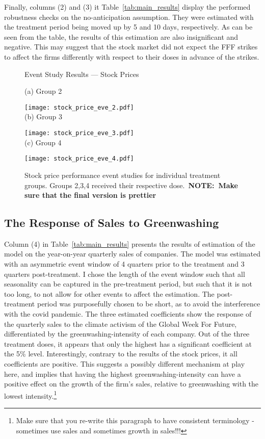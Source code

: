 \documentclass[12pt]{article}
\begin{document}
Finally, columns (2) and (3) it Table~\ref{tab:main_results} display the performed robustness checks on the no-anticipation assumption. They were estimated with the treatment period being moved up by 5 and 10 days, respectively. As can be seen from the table, the results of this estimation are also insignificant and negative. This may suggest that the stock market did not expect the FFF strikes to affect the firms differently with respect to their doses in advance of the strikes. 


\begin{figure}
    \caption{Event Study Results --- Stock Prices}\label{fig:eve_stock}
    \centering
    
    (a) Group 2
    
    \texttt{[image: stock\_price\_eve\_2.pdf]} \\
    
    (b) Group 3
    
    \texttt{[image: stock\_price\_eve\_3.pdf]} \\
    
    (c) Group 4
    
    \texttt{[image: stock\_price\_eve\_4.pdf]}
    
    \captionsetup{font=footnotesize}
    \caption*{Stock price performance event studies for individual treatment groups. Groups 2,3,4 received their respective dose.\ \textbf{NOTE:~Make sure that the final version is prettier}}
\end{figure}



\subsection{The Response of Sales to Greenwashing}

Column (4) in Table~\ref{tab:main_results} presents the results of estimation of the model on the year-on-year quarterly sales of companies. The model was estimated with an asymmetric event window of 4 quarters prior to the treatment and 3 quarters post-treatment. I chose the length of the event window such that all seasonality can be captured in the pre-treatment period, but such that it is not too long, to not allow for other events to affect the estimation. The post-treatment period was purposefully chosen to be short, as to avoid the interference with the covid pandemic. The three estimated coefficients show the response of the quarterly sales to the climate activism of the Global Week For Future, differentiated by the greenwashing-intensity of each company. Out of the three treatment doses, it appears that only the highest has a significant coefficient at the 5\% level. Interestingly, contrary to the results of the stock prices, it all coefficients are positive. This suggests a possibly different mechanism at play here, and implies that having the highest greenwashing-intensity can have a positive effect on the growth of the firm's sales, relative to greenwashing with the lowest intensity.\footnote{Make sure that you re-write this paragraph to have consistent terminology - sometimes use sales and sometimes growth in sales!!! }
\end{document}

